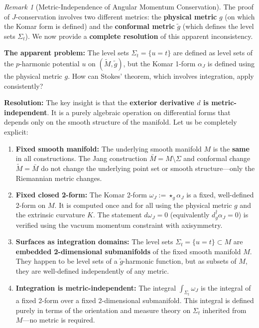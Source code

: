 \documentclass[12pt]{article}
\theoremstyle{plain}
\theoremstyle{definition}
\theoremstyle{remark}
\newtheorem{remark}[theorem]{Remark}
\begin{document}
\begin{remark}[Metric-Independence of Angular Momentum Conservation]
The proof of $J$-conservation involves two different metrics: the \textbf{physical metric} $g$ (on which the Komar form is defined) and the \textbf{conformal metric} $\tilde{g}$ (which defines the level sets $\Sigma_t$). We now provide a \textbf{complete resolution} of this apparent inconsistency.

\textbf{The apparent problem:} The level sets $\Sigma_t = \{u = t\}$ are defined as level sets of the $p$-harmonic potential $u$ on $(\tilde{M}, \tilde{g})$, but the Komar 1-form $\alpha_J$ is defined using the physical metric $g$. How can Stokes' theorem, which involves integration, apply consistently?

\textbf{Resolution:} The key insight is that the \textbf{exterior derivative $d$ is metric-independent}. It is a purely algebraic operation on differential forms that depends only on the smooth structure of the manifold. Let us be completely explicit:

\begin{enumerate}
    \item \textbf{Fixed smooth manifold:} The underlying smooth manifold $M$ is the \textbf{same} in all constructions. The Jang construction $\bar{M} = M \setminus \Sigma$ and conformal change $\tilde{M} = \bar{M}$ do not change the underlying point set or smooth structure---only the Riemannian metric changes.
    
    \item \textbf{Fixed closed 2-form:} The Komar 2-form $\omega_J := \star_g \alpha_J$ is a fixed, well-defined 2-form on $M$. It is computed once and for all using the physical metric $g$ and the extrinsic curvature $K$. The statement $d\omega_J = 0$ (equivalently $d^\dagger_g \alpha_J = 0$) is verified using the vacuum momentum constraint with axisymmetry.
    
    \item \textbf{Surfaces as integration domains:} The level sets $\Sigma_t = \{u = t\} \subset M$ are \textbf{embedded 2-dimensional submanifolds} of the fixed smooth manifold $M$. They happen to be level sets of a $\tilde{g}$-harmonic function, but as subsets of $M$, they are well-defined independently of any metric.
    
    \item \textbf{Integration is metric-independent:} The integral $\int_{\Sigma_t} \omega_J$ is the integral of a fixed 2-form over a fixed 2-dimensional submanifold. This integral is defined purely in terms of the orientation and measure theory on $\Sigma_t$ inherited from $M$---no metric is required.
    

\end{enumerate}
\end{remark}
\end{document}
